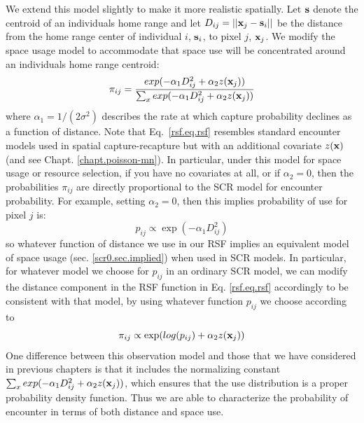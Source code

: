 We extend this model slightly to make it more realistic spatially. Let
${\bf s}$ denote the centroid of an individuals home range and let
$D_{ij} = ||{\bf x}_{j} - {\bf s}_{i}||$ be the distance from the home
range center of individual $i$, ${\bf s}_{i}$, to pixel $j$, ${\bf
  x}_{j}$. We modify the space usage model to accommodate that space
use will be concentrated around an individuals home range centroid:
\begin{equation}
 \pi_{ij} = \frac{ exp( -\alpha_{1} D_{ij}^{2} +\alpha_{2} z({\bf x}_{j}) ) }
{ \sum_{x} exp(-\alpha_{1} D_{ij}^{2} +\alpha_{2} z({\bf x}_{j}))}
\label{rsf.eq.rsf}
\end{equation}
where $\alpha_1=1/(2\sigma^2)$ describes the rate at which capture
probability declines as a function of distance. Note that
Eq.~\ref{rsf.eq.rsf} resembles standard encounter models used in
spatial capture-recapture but with an additional covariate $z({\bf
  x})$ (and see Chapt. \ref{chapt.poisson-mn}).  In particular, under
this model for space usage or resource selection, if you have no
covariates at all, or if $\alpha_{2} = 0$, then the probabilities
$\pi_{ij}$ are directly proportional to the SCR model for encounter
probability.  For example, setting $\alpha_{2} = 0$, then this implies
probability of use for pixel $j$ is:
\[
p_{ij} \propto  \exp( -\alpha_{1} D_{ij}^{2})
\]
so whatever function of distance we use in our RSF implies an
equivalent model of space usage (sec. \ref{scr0.sec.implied}) when
used in SCR models. In particular, for whatever model we choose for
$p_{ij}$ in an ordinary SCR model, we can modify the distance
component in the RSF function in Eq. \ref{rsf.eq.rsf} accordingly to
be consistent with that model, by using whatever function $p_{ij}$ we
choose according to
\[
\pi_{ij} \propto \exp( log(p_{ij}) + \alpha_{2} z({\bf x}_{j}) )
\]
One difference between this observation model and those that we have
considered in previous chapters is that it includes the normalizing
constant $\sum_{x} exp(-\alpha_{1} D_{ij}^{2} +\alpha_{2} z({\bf
  x}_{j}))$, which ensures that the use distribution is a proper
probability density function. Thus we are able to characterize the
probability of encounter in terms of both distance and space use.

